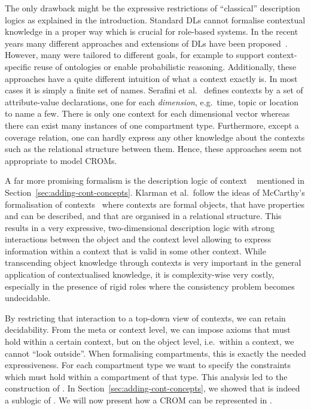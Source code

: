 The only drawback might be the expressive restrictions of ``classical'' description logics as
explained in the introduction. Standard DLs cannot formalise contextual knowledge in a proper way
which is crucial for role-based systems.  In the recent years many different approaches and
extensions of DLs have been proposed~\cite{BoGH-ISWC03, BoGH-WS04, BeAF-ADVIS06, BaVS-ModOnt09, BaKP-JWS12,
  CePe-IJCAR14, CePe-JAR17}.  However, many were tailored to different goals, for example to support
context-specific reuse of ontologies or enable probabilistic reasoning. Additionally, these
approaches have a quite different intuition of what a context exactly is. In most cases it is simply
a finite set of names.  Serafini et al.~\cite{SeHo-JWS12} defines contexts by a set of
attribute-value declarations, one for each \emph{dimension}, e.g.\ time, topic or location to name a
few. There is only one context for each dimensional vector whereas there can exist many instances
of one compartment type.  Furthermore, except a coverage relation, one can hardly express any other
knowledge about the contexts such as the relational structure between them.  Hence, these
approaches seem not appropriate to model CROMs.

A far more promising formalism is the description logic of context \klarALC~\cite{KG-JELIA10, KG16}
mentioned in Section~\ref{sec:adding-cont-concepts}. Klarman et al.\ follow the ideas of McCarthy's
formalisation of contexts~\cite{McC-ACM87,McC-IJCAI93} where contexts are formal objects, that have
properties and can be described, and that are organised in a relational structure.  This results in
a very expressive, two-dimensional description logic with strong interactions between the object and
the context level allowing to express information within a context that is valid in some other
context.  While transcending object knowledge through contexts is very important in the general
application of contextualised knowledge, it is complexity-wise very costly, especially in the
presence of rigid roles where the consistency problem becomes undecidable.

By restricting that interaction to a top-down view of contexts, we can retain decidability. From the
meta or context level, we can impose axioms that must hold within a certain context, but on the object
level, i.e.\ within a context, we cannot ``look outside''.
%
When formalising compartments, this is exactly the needed expressiveness. For each compartment type
we want to specify the constraints which must hold within a compartment of that type.
%
This analysis led to the construction of \LMLO.
In Section~\ref{sec:adding-cont-concepts}, we showed that \ALCALC is indeed a sublogic of \klarALC.
We will now present how a CROM can be represented in \LMLO.

